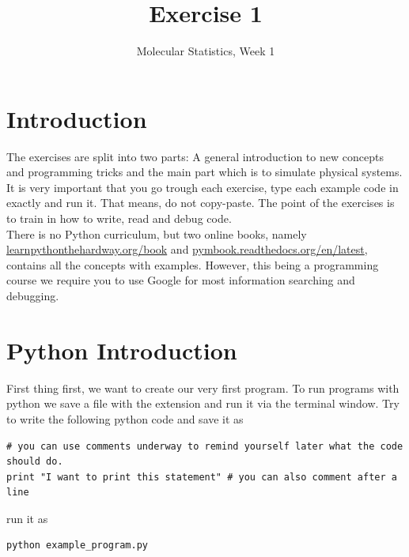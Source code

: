 \documentclass{article}
\title{Exercise 1}
\author{Molecular Statistics, Week 1}
\date{}
\begin{document}

\maketitle

\section*{Introduction}


The exercises are split into two parts: A general introduction to new concepts and programming tricks and the main part which is to simulate physical systems.
It is very important that you go trough each exercise, type each example code in exactly and run it.
That means, do not copy-paste.
The point of the exercises is to train
in how to write, read and debug code.\\


There is no Python curriculum, but two online books, namely
\href{http://learnpythonthehardway.org/book/}{learnpythonthehardway.org/book} and
\href{http://pymbook.readthedocs.org/en/latest/}{pymbook.readthedocs.org/en/latest},
contains all the concepts with examples.
However, this being a programming course we require you to use Google for most information searching and debugging.

\newpage
\section{Python Introduction}

First thing first, we want to create our very first program.
To run programs with python we save a file with the extension  and run it via the terminal window.
Try to write the following python code and save it as 

\begin{lstlisting}
# you can use comments underway to remind yourself later what the code should do.
print "I want to print this statement" # you can also comment after a line
\end{lstlisting}

run it as

\begin{lstlisting}
python example_program.py
\end{lstlisting}
\end{document}
